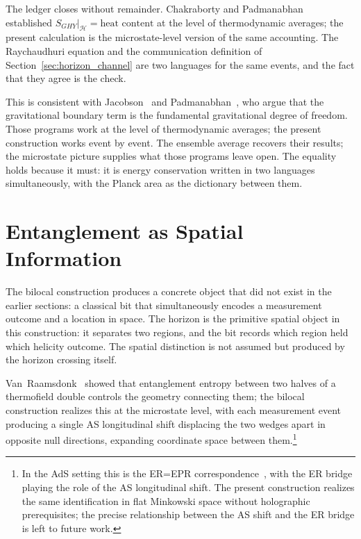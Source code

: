 \documentclass[12pt,a4paper]{article}
\begin{document}
The ledger closes without remainder. 
Chakraborty and Padmanabhan~\cite{chakraborty2020boundary} 
established $S_{GHY}|_{\mathcal{H}} = \text{heat content}$ 
at the level of thermodynamic averages; the present calculation 
is the microstate-level version of the same accounting. The 
Raychaudhuri equation and the communication definition of 
Section~\ref{sec:horizon_channel} are two languages for the 
same events, and the fact that they agree is the check.

This is consistent with Jacobson~\cite{jacobson1995thermodynamics} 
and Padmanabhan~\cite{padmanabhan2010thermodynamical}, who argue 
that the gravitational boundary term is the fundamental 
gravitational degree of freedom. Those programs work at the 
level of thermodynamic averages; the present construction works 
event by event. The ensemble average recovers their results; 
the microstate picture supplies what those programs leave open.
The equality holds because it must: it is energy conservation 
written in two languages simultaneously, with the Planck area 
as the dictionary between them.


\section{Entanglement as Spatial Information}
\label{sec:erepr}

The bilocal construction produces a concrete object 
that did not exist in the earlier sections: a classical 
bit that simultaneously encodes a measurement outcome 
and a location in space. The horizon is the primitive 
spatial object in this construction: it separates two 
regions, and the bit records which region held which 
helicity outcome. The spatial distinction is not 
assumed but produced by the horizon crossing itself.

Van~Raamsdonk~\cite{van2010building} showed 
that entanglement entropy between two halves of a 
thermofield double controls the geometry connecting 
them; the bilocal construction realizes this at the 
microstate level, with each measurement event 
producing a single AS longitudinal shift displacing 
the two wedges apart in opposite null directions, 
expanding coordinate space between them.\footnote{
  In the AdS setting this is the 
  ER=EPR correspondence~\cite{maldacena2013cool}, with 
  the ER bridge playing the role of the AS longitudinal 
  shift. The present construction realizes the same 
  identification in flat Minkowski space without 
  holographic prerequisites; the precise relationship 
  between the AS shift and the ER bridge is left to 
  future work.}
\end{document}
